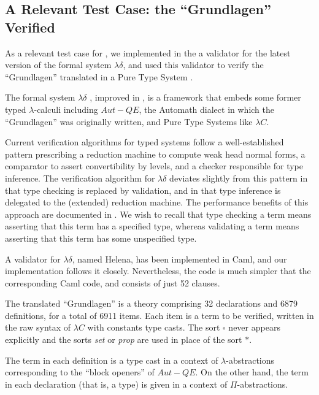 \subsection{A Relevant Test Case: the ``Grundlagen'' Verified}
\label{grundlagen}

As a relevant test case for \elpi,
we implemented in the \frag{}
a validator for the latest version of the formal system $\lambda\delta$,
and used this validator to verify the
``Grundlagen'' \cite{Jut79} translated in a Pure Type System
\cite{Brn92}.

The formal system $\lambda\delta$ \cite{lambdadeltaJ1},
improved in \cite{lambdadeltaJ2a,lambdadeltaJ3a},
is a framework that embeds
some former typed $\lambda$-calculi including 
$Aut-QE$, the Automath dialect in which the ``Grundlagen'' was
originally written, and Pure Type Systems like $\lambda C$.

Current verification algorithms for typed systems follow
a well-established pattern prescribing a reduction
machine to compute weak head normal forms, a comparator to assert
convertibility by levels, and a checker responsible for type inference.
The verification algorithm for $\lambda\delta$ 
deviates slightly from this pattern in that
type checking is replaced by validation, and in that
type inference is delegated to the (extended) reduction machine. 
The performance benefits of this approach are documented in
\cite{lambdadeltaJ3a}.
We wish to recall that type checking a term means
asserting that this term has a specified type, whereas
validating a term means asserting that this term has 
some unspecified type.

A validator for $\lambda\delta$, named Helena,
has been implemented in Caml,
and our \lp{} implementation follows it closely.
Nevertheless, the \lp{} code is much simpler that the
corresponding Caml code, and consists of just 52 clauses.

The translated ``Grundlagen'' is a theory comprising 
32 declarations and 6879 definitions, for a total of 6911 items.
Each item is a term to be verified, written in the raw syntax of
$\lambda C$ with constants type casts. The sort $\square$ never
appears explicitly and the sorts \emph{set} or \emph{prop}
are used in place of the sort $\ast$.

The term in each definition is a type cast in a 
context of $\lambda$-abstractions corresponding to the ``block openers''
of $Aut-QE$.
On the other hand, the term in each declaration (that is, a type) is
given in a context of $\Pi$-abstractions.

